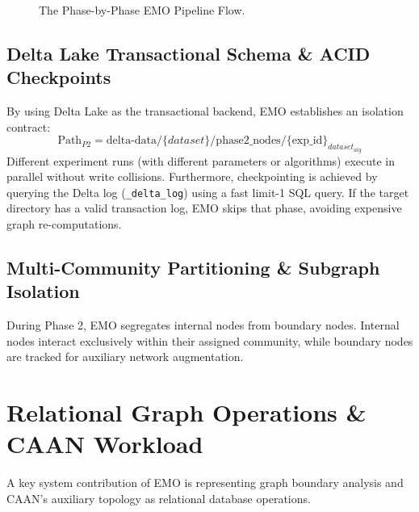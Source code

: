 \documentclass[conference,compsoc]{IEEEtran}
\begin{document}
\begin{figure}[!h]
\centering
{}
\caption{The Phase-by-Phase EMO Pipeline Flow.}
\label{fig_phases}
\end{figure}

\subsection{Delta Lake Transactional Schema \& ACID Checkpoints}
By using Delta Lake as the transactional backend, EMO establishes an isolation contract:
\begin{equation}
\text{Path}_{P2} = \text{delta-data/}\{dataset\}/\text{phase2\_nodes}/\{\text{exp\_id}\}_{dataset}_{alg}
\end{equation}
Different experiment runs (with different parameters or algorithms) execute in parallel without write collisions. Furthermore, checkpointing is achieved by querying the Delta log (\verb|_delta_log|) using a fast limit-1 SQL query. If the target directory has a valid transaction log, EMO skips that phase, avoiding expensive graph re-computations.

\subsection{Multi-Community Partitioning \& Subgraph Isolation}
During Phase 2, EMO segregates internal nodes from boundary nodes. Internal nodes interact exclusively within their assigned community, while boundary nodes are tracked for auxiliary network augmentation.

\section{Relational Graph Operations \& CAAN Workload}
A key system contribution of EMO is representing graph boundary analysis and CAAN's auxiliary topology as relational database operations.
\end{document}
